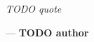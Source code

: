\clearpage
\thispagestyle{empty}

\vspace*{\fill} 

\begin{flushright}
    \begin{minipage}{0.5\textwidth} 
        \textit{TODO quote}
        
        \vspace{0.5cm}
        \begin{flushright}
            --- \textbf{TODO author}
        \end{flushright}
    \end{minipage}
\end{flushright}

\clearpage